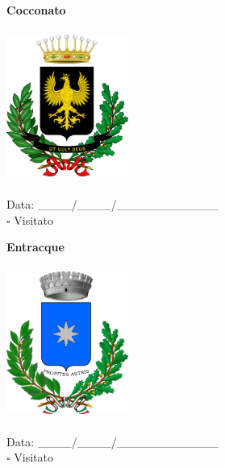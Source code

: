 \documentclass[a5paper,12pt]{article}
\begin{document}
\vspace{0.7cm}

\noindent
\begin{minipage}[t]{0.45\textwidth}
    \begin{center}
        \textbf{Cocconato}
    \end{center}
    \vspace{-0.5cm} %
    \begin{center}
        \includegraphics[height= 5cm, width=4cm]{Piemonte/Stemma Cocconato.png}
    \end{center}
    \vspace{-0.4cm} %
    \begin{flushleft}
        Data: \_\_\_\_/\_\_\_\_/\_\_\_\_\_\_\_\_\_\_\_\_ \\
        $\square$ Visitato
    \end{flushleft}
\end{minipage}
\hfill
\noindent
\begin{minipage}[t]{0.45\textwidth}
    \begin{center}
        \textbf{Entracque}
    \end{center}
    \vspace{-0.5cm} %
    \begin{center}
        \includegraphics[height= 5cm, width=4cm]{Piemonte/Stemma Entracque.png}
    \end{center}
    \vspace{-0.4cm} %
    \begin{flushleft}
        Data: \_\_\_\_/\_\_\_\_/\_\_\_\_\_\_\_\_\_\_\_\_ \\
        $\square$ Visitato
    \end{flushleft}
\end{minipage}
\end{document}
